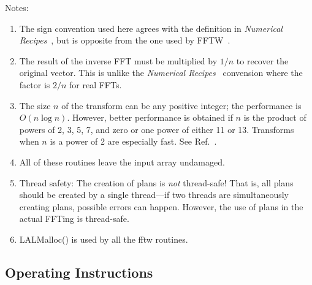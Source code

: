 \documentclass{article}
\begin{document}
Notes:
\begin{enumerate}
\item The sign convention used here agrees with the definition in
\textit{Numerical Recipes}~\cite{ptvf:1992}, but is opposite from the one used
by FFTW~\cite{fj:1998}.
\item The result of the inverse FFT must be multiplied by $1/n$ to recover the
original vector.  This is unlike the \textit{Numerical
Recipes}~\cite{ptvf:1992} convension where the factor is $2/n$ for real FFTs.
\item The size $n$ of the transform can be any positive integer; the
performance is $O(n\log n)$.  However, better performance is obtained if $n$
is the product of powers of 2, 3, 5, 7, and zero or one power of either 11 or
13.  Transforms when $n$ is a power of 2 are especially fast.  See
Ref.~\cite{fj:1998}.
\item All of these routines leave the input array undamaged.
\item Thread safety: The creation of plans is \emph{not} thread-safe!  That
is, all plans should be created by a single thread---if two threads are
simultaneously creating plans, possible errors can happen.  However, the use
of plans in the actual FFTing is thread-safe.
\item LALMalloc() is used by all the fftw routines.
\end{enumerate}

\subsection{Operating Instructions}

\end{document}
